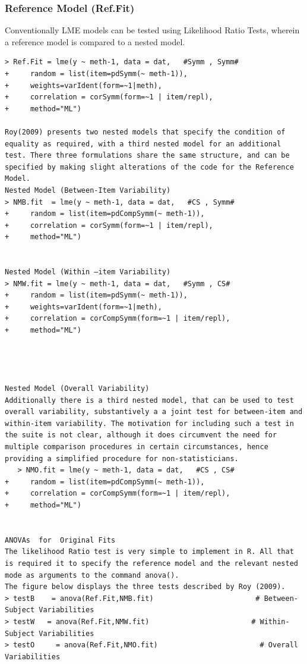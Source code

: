 \documentclass[12pt, a4paper]{report}
\theoremstyle{plain}
\theoremstyle{definition}
\theoremstyle{remark}
\begin{document}
\subsubsection{Reference Model (Ref.Fit)}
Conventionally LME models can be tested using Likelihood Ratio Tests, wherein a reference model is compared to a nested model.
\begin{framed}
\begin{verbatim}
> Ref.Fit = lme(y ~ meth-1, data = dat,   #Symm , Symm#
+     random = list(item=pdSymm(~ meth-1)), 
+     weights=varIdent(form=~1|meth),
+     correlation = corSymm(form=~1 | item/repl), 
+     method="ML")

Roy(2009) presents two nested models that specify the condition of equality as required, with a third nested model for an additional test. There three formulations share the same structure, and can be specified by making slight alterations of the code for the Reference Model.
Nested Model (Between-Item Variability)
> NMB.fit  = lme(y ~ meth-1, data = dat,   #CS , Symm#
+     random = list(item=pdCompSymm(~ meth-1)),
+     correlation = corSymm(form=~1 | item/repl), 
+     method="ML")


Nested Model (Within –item Variability)
> NMW.fit = lme(y ~ meth-1, data = dat,   #Symm , CS# 
+     random = list(item=pdSymm(~ meth-1)),
+     weights=varIdent(form=~1|meth), 
+     correlation = corCompSymm(form=~1 | item/repl), 
+     method="ML")




Nested Model (Overall Variability)
Additionally there is a third nested model, that can be used to test overall variability, substantively a a joint test for between-item and within-item variability. The motivation for including such a test in the suite is not clear, although it does circumvent the need for multiple comparison procedures in certain circumstances, hence providing a simplified procedure for non-statisticians.
   > NMO.fit = lme(y ~ meth-1, data = dat,   #CS , CS# 
+     random = list(item=pdCompSymm(~ meth-1)), 
+     correlation = corCompSymm(form=~1 | item/repl), 
+     method="ML")


ANOVAs  for  Original Fits
The likelihood Ratio test is very simple to implement in R. All that is required it to specify the reference model and the relevant nested mode as arguments to the command anova().
The figure below displays the three tests described by Roy (2009).
> testB    = anova(Ref.Fit,NMB.fit)                        # Between-Subject Variabilities
> testW   = anova(Ref.Fit,NMW.fit)                        # Within-Subject Variabilities
> testO     = anova(Ref.Fit,NMO.fit)                        # Overall Variabilities


\end{verbatim}
\end{framed}
\end{document}
